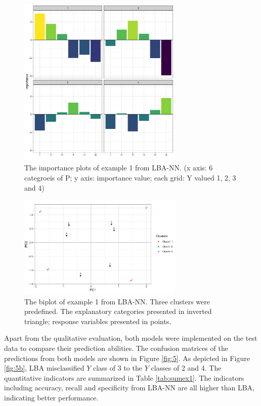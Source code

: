\documentclass[]{interact}
\theoremstyle{plain}%
\theoremstyle{definition}
\theoremstyle{remark}
\begin{document}
\begin{figure}[H]
\centering
\includegraphics[width=0.7\textwidth]{figure/3_importance_plot_example_1.png}
\caption{The importance plots of example 1 from LBA-NN. (x axis: 6 categroeis of P; y axis: importance value; each grid: Y valued 1, 2, 3 and 4) \label{fig:impex1}}
\end{figure}

\begin{figure}[H]
\centering
\includegraphics[width=0.7\textwidth]{figure/4_biplot_example_1.png}
\caption{The biplot of example 1 from LBA-NN. Three clusters were predefined. The explanatory categories presented in inverted triangle; response variables presented in points.
\label{fig:bipex1}}
\end{figure}

Apart from the qualitative evaluation, both models were implemented on
the test data to compare their prediction abilities. The confusion
matrices of the predictions from both models are shown in Figure
\ref{fig:5}. As depicted in Figure \ref{fig:5b}, LBA misclassified \(Y\)
class of 3 to the \(Y\) classes of 2 and 4. The quantitative indicators
are summarized in Table \ref{tab:sumex1}. The indicators including
accuracy, recall and specificity from LBA-NN are all higher than LBA,
indicating better performance.
\end{document}

